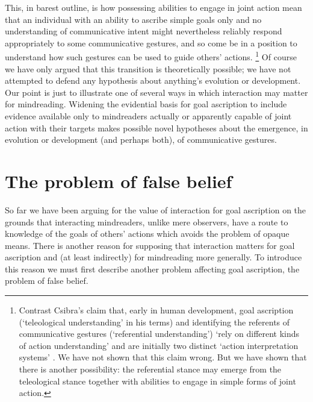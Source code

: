 \documentclass[14pt,a4paper]{extarticle}
\begin{document}
This, in barest outline, is 
how
possessing abilities to engage in joint action
mean that 
an individual with an ability to ascribe simple goals only and no understanding of communicative intent
might 
nevertheless reliably respond appropriately to some communicative gestures,
and so come be in a position to understand how such gestures can be used to guide others' actions.%
\footnote{
Contrast Csibra's claim that,
early in human development,
goal ascription (`teleological understanding' in his terms)
and 
identifying the referents of communicative gestures (`referential understanding')
`rely on different kinds of action understanding' %
and
are initially two distinct `action interpretation systems'   \citep[p.\ 456]{Csibra:2003kp}.
We have not shown that this claim wrong.
But we have shown that there is another possibility:
the referential stance may 
emerge from
the teleological stance
 together with abilities to engage in simple forms of joint action.
}
Of course we have only argued that this transition is theoretically possible;
we have not attempted to defend any hypothesis about 
anything's evolution or development.
Our point is just to illustrate one of several ways in which
interaction may matter for mindreading.
Widening the evidential basis for goal ascription
to include evidence available only to mindreaders actually or apparently capable of joint action with their targets
makes possible 
novel hypotheses about the emergence, in evolution or development (and perhaps both), of communicative gestures.



\section{The problem of false belief}
\label{sec:false_belief}
So far we have been arguing for the value of interaction for goal ascription
on the grounds that 
interacting mindreaders, unlike mere observers, have 
a route to knowledge of the goals of others' actions
which avoids the problem of opaque means.
There is another reason for supposing that interaction matters for goal ascription and (at least indirectly) for mindreading more generally.
To introduce this reason we must first describe another problem affecting goal ascription, the problem of false belief.
\end{document}
